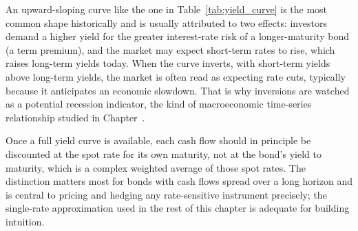\documentclass[../ai_in_finance]{subfiles}
\begin{document}
An upward-sloping curve like the one in Table~\ref{tab:yield_curve} is the most common shape historically and is usually attributed to two effects: investors demand a higher yield for the greater interest-rate risk of a longer-maturity bond (a term premium), and the market may expect short-term rates to rise, which raises long-term yields today. When the curve inverts, with short-term yields above long-term yields, the market is often read as expecting rate cuts, typically because it anticipates an economic slowdown. That is why inversions are watched as a potential recession indicator, the kind of macroeconomic time-series relationship studied in Chapter~.

Once a full yield curve is available, each cash flow should in principle be discounted at the spot rate for its own maturity, not at the bond's yield to maturity, which is a complex weighted average of those spot rates. The distinction matters most for bonds with cash flows spread over a long horizon and is central to pricing and hedging any rate-sensitive instrument precisely; the single-rate approximation used in the rest of this chapter is adequate for building intuition.

\end{document}
